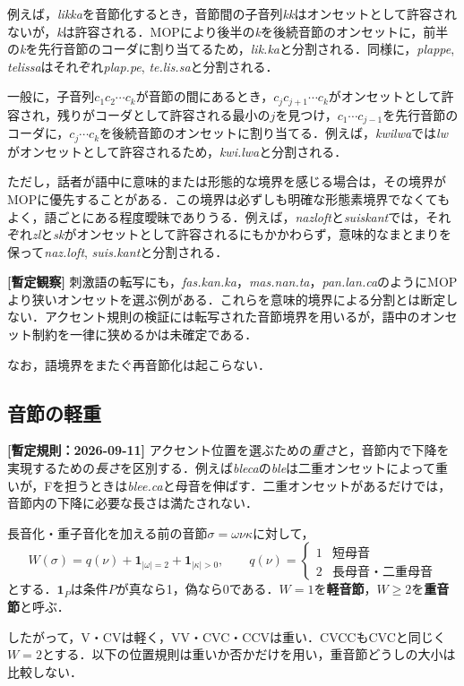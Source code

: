 \documentclass[../../main-detail.tex]{subfiles}
\begin{document}
例えば，\textit{likka}を音節化するとき，音節間の子音列\textit{kk}はオンセットとして許容されないが，\textit{k}は許容される．MOPにより後半の\textit{k}を後続音節のオンセットに，前半の\textit{k}を先行音節のコーダに割り当てるため，\textit{lik.ka}と分割される．同様に，\textit{plappe}, \textit{telissa}はそれぞれ\textit{plap.pe}, \textit{te.lis.sa}と分割される．

一般に，子音列$c_1 c_2 \cdots c_k$が音節の間にあるとき，$c_j c_{j+1}\cdots c_k$がオンセットとして許容され，残りがコーダとして許容される最小の$j$を見つけ，$c_1\cdots c_{j-1}$を先行音節のコーダに，$c_j\cdots c_k$を後続音節のオンセットに割り当てる．例えば，\textit{kwilwa}では\textit{lw}がオンセットとして許容されるため，\textit{kwi.lwa}と分割される．

ただし，話者が語中に意味的または形態的な境界を感じる場合は，その境界がMOPに優先することがある．この境界は必ずしも明確な形態素境界でなくてもよく，語ごとにある程度曖昧でありうる．例えば，\textit{nazloft}と\textit{suiskant}では，それぞれ\textit{zl}と\textit{sk}がオンセットとして許容されるにもかかわらず，意味的なまとまりを保って\textit{naz.loft}, \textit{suis.kant}と分割される．

\textbf{[暫定観察]} 刺激語の転写にも，\textit{fas.kan.ka}，\textit{mas.nan.ta}，\textit{pan.lan.ca}のようにMOPより狭いオンセットを選ぶ例がある．これらを意味的境界による分割とは断定しない．アクセント規則の検証には転写された音節境界を用いるが，語中のオンセット制約を一律に狭めるかは未確定である．

なお，語境界をまたぐ再音節化は起こらない．

\subsection{音節の軽重}
\textbf{[暫定規則：2026-09-11]} アクセント位置を選ぶための\emph{重さ}と，音節内で下降を実現するための\emph{長さ}を区別する．例えば\textit{bleca}の\textit{ble}は二重オンセットによって重いが，Fを担うときは\textit{blee.ca}と母音を伸ばす．二重オンセットがあるだけでは，音節内の下降に必要な長さは満たされない．

\begin{definition}[位置選択用の重さ]
長音化・重子音化を加える前の音節$\sigma=\omega\nu\kappa$に対して，
\[
 W(\sigma)=q(\nu)+\mathbf{1}_{|\omega|=2}+\mathbf{1}_{|\kappa|>0},
 \qquad
 q(\nu)=\begin{cases}1&\text{短母音}\\2&\text{長母音・二重母音}\end{cases}
\]
とする．$\mathbf{1}_P$は条件$P$が真なら1，偽なら0である．$W=1$を\textbf{軽音節}，$W\geq2$を\textbf{重音節}と呼ぶ．
\end{definition}
したがって，V・CVは軽く，VV・CVC・CCVは重い．CVCCもCVCと同じく$W=2$とする．以下の位置規則は重いか否かだけを用い，重音節どうしの大小は比較しない．
\end{document}
